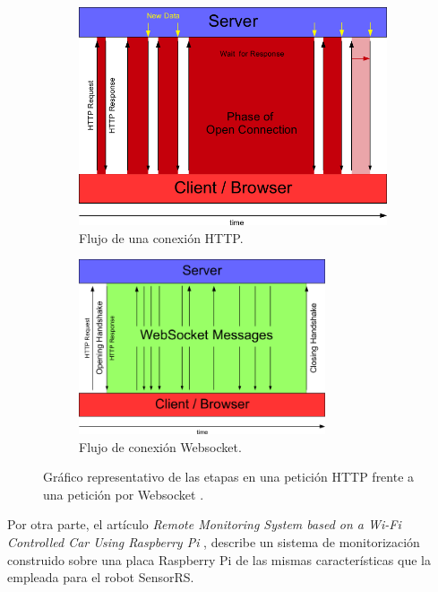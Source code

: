    
\begin{figure}[H]
    \centering
    \begin{subfigure}[b]{0.4\textwidth}
        \includegraphics[width=\textwidth]{imagenes/tiempos_conexion.png}
        \caption{Flujo de una conexión HTTP.}
        \label{fig:gull}
    \end{subfigure}
    \begin{subfigure}[b]{0.5\textwidth}
        \includegraphics[width=0.8\textwidth]{imagenes/websocket_fases.png}
        \caption{Flujo de conexión Websocket. }
        \label{fig:tiger}
    \end{subfigure}
    \caption{Gráfico representativo de las etapas en una petición HTTP frente a una petición por Websocket  \cite{article:3}.}\label{fig:animals}
\end{figure}
  
  
Por otra parte, el artículo \emph{ Remote Monitoring System based on a Wi-Fi Controlled Car Using Raspberry Pi } \cite{article:3}, describe un sistema de monitorización construido sobre una placa 
Raspberry Pi de las mismas características que la empleada para el robot SensorRS.\\ 

